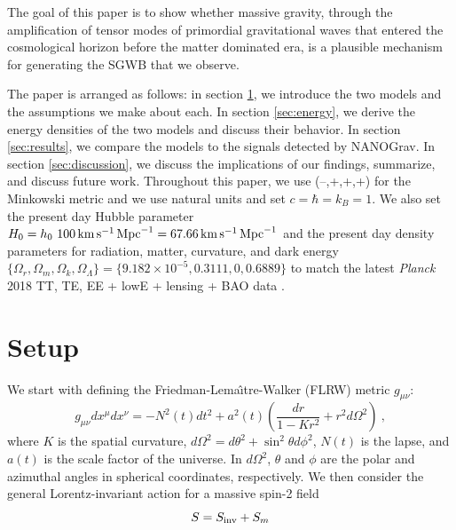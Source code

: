 \documentclass[prd,twocolumn,aps,psfig,nofootinbib,nobibnotes,superscriptaddress,preprintnumbers,times]{revtex4-2}
\newcommand{\s}{\,{\rm s}}
\newcommand{\km}{\,{\rm km}}
\newcommand{\Mpc}{\,{\rm Mpc}}
\newcommand{\inv}{\rm inv}
\begin{document}
The goal of this paper is to show whether massive gravity, through the amplification of tensor modes of primordial gravitational waves that entered the cosmological horizon before the matter dominated era, is a plausible mechanism for generating the SGWB that we observe. 

The paper is arranged as follows: in section \ref{sec:setup}, we introduce the two models and the assumptions we make about each. In section \ref{sec:energy}, we derive the energy densities of the two models and discuss their behavior. In section \ref{sec:results}, we compare the models to the signals detected by NANOGrav. In section \ref{sec:discussion}, we discuss the implications of our findings, summarize, and discuss future work. Throughout this paper, we use  (--,+,+,+) for the Minkowski metric and we use natural units and set $c = \hbar = k_B = 1$. We also set the present day Hubble parameter $H_0 = h_0\ 100 \km \s^{-1}\Mpc^{-1} = 67.66 \km \s^{-1}\Mpc^{-1}$ and the present day density parameters for radiation, matter, curvature, and dark energy $\{\Omega_r, \Omega_m, \Omega_k, \Omega_\Lambda\} = \{9.182\times10^{-5},0.3111,0,0.6889\}$ to match the latest \textit{Planck} 2018 TT, TE, EE + lowE + lensing + BAO data \cite{Planck:2020}.

\section{Setup}\label{sec:setup}
We start with defining the Friedman-Lema\^{\i}tre-Walker (FLRW) metric $g_{\mu\nu}$:
\begin{equation}\label{eqn:metric}
    g_{\mu\nu}dx^{\mu} dx^{\nu} = -N^2(t)dt^2 +a^2(t)\left(\frac{dr}{1-Kr^2} + r^2 d\Omega^2\right)\ ,
\end{equation}
where $K$ is the spatial curvature, $d\Omega^2 = d\theta^2 + \sin^2\theta d\phi^2$, $N(t)$ is the lapse, and $a(t)$ is the scale factor of the universe. In $d\Omega^2$, $\theta$ and $\phi$ are the polar and azimuthal angles in spherical coordinates, respectively. We then consider the general Lorentz-invariant action for a massive spin-2 field \cite{Blasi:2017}
\begin{equation}\label{eqn:action}
    S = S_{\inv} + S_{m}
\end{equation}
\end{document}
